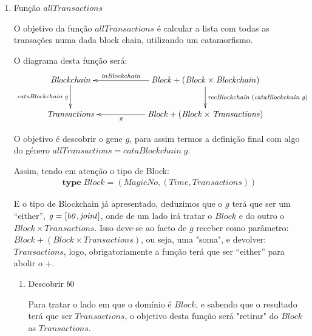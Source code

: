 \documentclass[a4paper]{article}
\newcommand{\Conid}[1]{\mathit{#1}}
\newcommand{\Varid}[1]{\mathit{#1}}
\begin{document}
\begin{enumerate}
\item Função \ensuremath{\Varid{allTransactions}}

O objetivo da função \ensuremath{\Varid{allTransactions}} é calcular a lista com todas as transações
numa dada block chain, utilizando um catamorfismo.

O diagrama desta função será:
\begin{eqnarray*}
\xymatrix@C=2cm{
    \ensuremath{\Conid{Blockchain}}
           \ar[d]_-{\ensuremath{\Varid{cataBlockchain}\;\Varid{g}}}
&
    \ensuremath{\Conid{Block}\mathbin{+}(\Conid{Block}\times\Conid{Blockchain})}
           \ar[d]^{\ensuremath{\Varid{recBlockchain}\;(\Varid{cataBlockchain}\;\Varid{g})}}
           \ar[l]_-{\ensuremath{\Varid{inBlockchain}}}
\\
     \ensuremath{\Conid{Transactions}}
&
     \ensuremath{\Conid{Block}\mathbin{+}(\Conid{Block}\times\Conid{Transactions})}
           \ar[l]^-{\ensuremath{\Varid{g}}}
}
\end{eqnarray*}


O objetivo é descobrir o gene \ensuremath{\Varid{g}}, para assim termos a definição final com
algo do género \ensuremath{\Varid{allTransactions}\mathrel{=}\Varid{cataBlockchain}\;\Varid{g}}.

Assim, tendo em atenção o tipo de Block:
\begin{eqnarray*}
\ensuremath{\mathbf{type}\;\Conid{Block}\mathrel{=}(\Conid{MagicNo},(\Conid{Time},\Conid{Transactions}))}
\end{eqnarray*}

E o tipo de Blockchain já apresentado, deduzimos que o \ensuremath{\Varid{g}} terá que ser um ``either'',
\ensuremath{\Varid{g}\mathrel{=}\alt{\Varid{b0}}{\Varid{joint}}},
onde de um lado irá tratar o \ensuremath{\Conid{Block}} e do outro o \ensuremath{\Conid{Block}\times\Conid{Transactions}}. Isso deve-se
ao facto de \ensuremath{\Varid{g}} receber como parâmetro: \ensuremath{\Conid{Block}\mathbin{+}(\Conid{Block}\times\Conid{Transactions})}, ou seja, uma
"soma", e devolver: \ensuremath{\Conid{Transactions}}, logo, obrigatoriamente a função terá que ser ``either''
para abolir o \ensuremath{\mathbin{+}}.


\begin{enumerate}
\item Descobrir \ensuremath{\Varid{b0}}

Para tratar o lado em que o domínio é \ensuremath{\Conid{Block}}, e sabendo que o resultado terá que
ser \ensuremath{\Conid{Transactions}}, o objetivo desta função será "retirar" do \ensuremath{\Conid{Block}} as \ensuremath{\Conid{Transactions}}.


\end{enumerate}
\end{enumerate}
\end{document}
